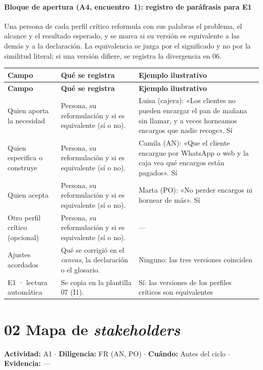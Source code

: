 \documentclass[12pt,letterpaper,oneside]{report}
\begin{document}
\paragraph{Bloque de apertura (A4, encuentro~1): registro de paráfrasis para E1}
Una persona de cada perfil crítico reformula con sus palabras el problema, el alcance y el resultado esperado, y se marca si su versión es equivalente a las demás y a la declaración. La equivalencia se juzga por el significado y no por la similitud literal; si una versión difiere, se registra la divergencia en 06.


{\scriptsize\renewcommand{\arraystretch}{1.25}\setlength{\tabcolsep}{3pt}
\begin{xltabular}{\textwidth}{@{}>{\raggedright\arraybackslash}p{0.25\textwidth}>{\raggedright\arraybackslash}X>{\raggedright\arraybackslash}p{0.30\textwidth}@{}}
\toprule
\textbf{Campo} & \textbf{Qué se registra} & \textbf{Ejemplo ilustrativo} \\
\midrule
\endfirsthead
\toprule
\textbf{Campo} & \textbf{Qué se registra} & \textbf{Ejemplo ilustrativo} \\
\midrule
\endhead
\bottomrule
\endlastfoot
Quien aporta la necesidad & Persona, su reformulación y si es equivalente (sí o no). & Luisa (cajera): «Los clientes no pueden encargar el pan de mañana sin llamar, y a veces horneamos encargos que nadie recoge». Sí \\
Quien especifica o construye & Persona, su reformulación y si es equivalente (sí o no). & Camila (AN): «Que el cliente encargue por WhatsApp o web y la caja vea qué encargos están pagados». Sí \\
Quien acepta & Persona, su reformulación y si es equivalente (sí o no). & Marta (PO): «No perder encargos ni hornear de más». Sí \\
Otro perfil crítico (opcional) & Persona, su reformulación y si es equivalente (sí o no). & — \\
Ajustes acordados & Qué se corrigió en el \textit{canvas}, la declaración o el glosario. & Ninguno: las tres versiones coinciden \\
E1 · lectura automática & Se copia en la plantilla 07 (I1). & Sí: las versiones de los perfiles críticos son equivalentes \\
\end{xltabular}}

\section{02 Mapa de \textit{stakeholders}}
\noindent\textbf{Actividad:} A1 $\cdot$ \textbf{Diligencia:} FR (AN, PO) $\cdot$ \textbf{Cuándo:} Antes del ciclo $\cdot$ \textbf{Evidencia:} —
\end{document}
